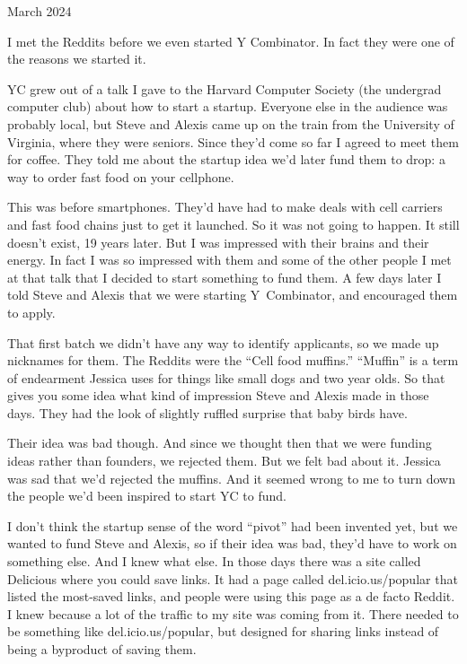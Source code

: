 March 2024

I met the Reddits before we even started Y Combinator. In fact they were
one of the reasons we started it.

YC grew out of a talk I gave to the Harvard Computer Society (the
undergrad computer club) about how to start a startup. Everyone else in
the audience was probably local, but Steve and Alexis came up on the
train from the University of Virginia, where they were seniors. Since
they'd come so far I agreed to meet them for coffee. They told me about
the startup idea we'd later fund them to drop: a way to order fast food
on your cellphone.

This was before smartphones. They'd have had to make deals with cell
carriers and fast food chains just to get it launched. So it was not
going to happen. It still doesn't exist, 19 years later. But I was
impressed with their brains and their energy. In fact I was so impressed
with them and some of the other people I met at that talk that I decided
to start something to fund them. A few days later I told Steve and
Alexis that we were starting Y~Combinator, and encouraged them to apply.

That first batch we didn't have any way to identify applicants, so we
made up nicknames for them. The Reddits were the ``Cell food muffins.''
``Muffin'' is a term of endearment Jessica uses for things like small
dogs and two year olds. So that gives you some idea what kind of
impression Steve and Alexis made in those days. They had the look of
slightly ruffled surprise that baby birds have.

Their idea was bad though. And since we thought then that we were
funding ideas rather than founders, we rejected them. But we felt bad
about it. Jessica was sad that we'd rejected the muffins. And it seemed
wrong to me to turn down the people we'd been inspired to start YC to
fund.

I don't think the startup sense of the word ``pivot'' had been invented
yet, but we wanted to fund Steve and Alexis, so if their idea was bad,
they'd have to work on something else. And I knew what else. In those
days there was a site called Delicious where you could save links. It
had a page called del.icio.us/popular that listed the most-saved links,
and people were using this page as a de facto Reddit. I knew because a
lot of the traffic to my site was coming from it. There needed to be
something like del.icio.us/popular, but designed for sharing links
instead of being a byproduct of saving them.

